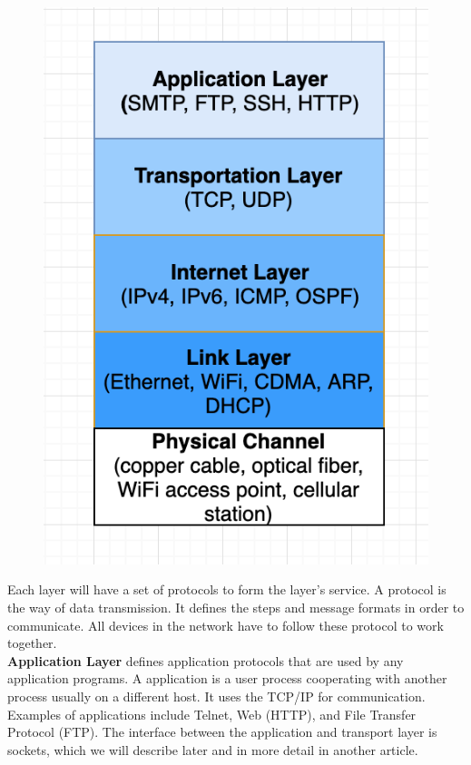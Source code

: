 \documentclass[a4paper, 11pt]{article}
\begin{document}
\begin{figure}[h]
\includegraphics[scale=0.6]{networking-layers.png}
\end{figure}

Each layer will have a set of protocols to form the layer's service. A protocol is the way of data transmission. It defines the steps and message formats in order to communicate. All devices in the network have to follow these protocol to work together.\\

\textbf{Application Layer} defines application protocols that are used by any application programs. A application is a user process cooperating with another process usually on a different host. It uses the TCP/IP for communication. Examples of applications include Telnet, Web (HTTP), and File Transfer Protocol (FTP). The interface between the application and transport layer is sockets, which we will describe later and in more detail in another article.\\
\end{document}
